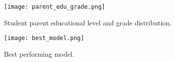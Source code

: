 	
\begin{figure}[H]
	\centering 
	\texttt{[image: parent\_edu\_grade.png]}
	\caption{Student parent educational level and grade distribution. \label{fig:parent_edu_level}}
\end{figure}

\begin{figure}[H]
	\centering 
	\texttt{[image: best\_model.png]}
	\caption{Best performing model.  \label{fig:best_model}}
\end{figure}
